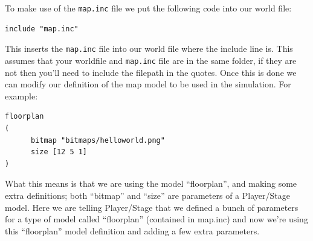 \documentclass[a4paper]{report}
\newcommand{\plst}{Player/Stage\xspace}
\begin{document}
To make use of the \verb|map.inc| file we put the following code into our world file:
\begin{verbatim}
include "map.inc"
\end{verbatim}
This inserts the \verb|map.inc| file into our world file where the include line is. This assumes that your worldfile and \verb|map.inc| file are in the same folder, if they are not then you'll need to include the filepath in the quotes. Once this is done we can modify our definition of the map model to be used in the simulation. For example:
\begin{verbatim}
floorplan
(
      bitmap "bitmaps/helloworld.png"
      size [12 5 1]	
)
\end{verbatim}
What this means is that we are using the model ``floorplan'', and making some extra definitions; both ``bitmap'' and ``size'' are parameters of a \plst model. Here we are telling \plst that we defined a bunch of parameters for a type of model called ``floorplan'' (contained in map.inc) and now we're using this ``floorplan'' model definition and adding a few extra parameters.
\end{document}

